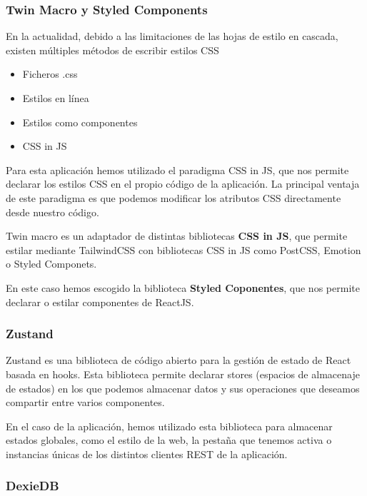 \hypertarget{twin-macro-y-styled-components}{%
\subsubsection{Twin Macro y Styled
Components}\label{twin-macro-y-styled-components}}

En la actualidad, debido a las limitaciones de las hojas de estilo en
cascada, existen múltiples métodos de escribir estilos CSS

\begin{itemize}
\item
  Ficheros .css
\item
  Estilos en línea
\item
  Estilos como componentes
\item
  CSS in JS
\end{itemize}

Para esta aplicación hemos utilizado el paradigma CSS in JS, que nos
permite declarar los estilos CSS en el propio código de la aplicación.
La principal ventaja de este paradigma es que podemos modificar los
atributos CSS directamente desde nuestro código.

Twin macro es un adaptador de distintas bibliotecas \textbf{CSS in JS},
que permite estilar mediante TailwindCSS con bibliotecas CSS in JS como
PostCSS, Emotion o Styled Componets.

En este caso hemos escogido la biblioteca \textbf{Styled Coponentes},
que nos permite declarar o estilar componentes de ReactJS.

\hypertarget{zustand}{%
\subsubsection{Zustand}\label{zustand}}

Zustand es una biblioteca de código abierto para la gestión de estado de
React basada en hooks. Esta biblioteca permite declarar stores (espacios
de almacenaje de estados) en los que podemos almacenar datos y sus
operaciones que deseamos compartir entre varios componentes.

En el caso de la aplicación, hemos utilizado esta biblioteca para
almacenar estados globales, como el estilo de la web, la pestaña que
tenemos activa o instancias únicas de los distintos clientes REST de la
aplicación.

\hypertarget{dexiedb}{%
\subsubsection{DexieDB}\label{dexiedb}}

